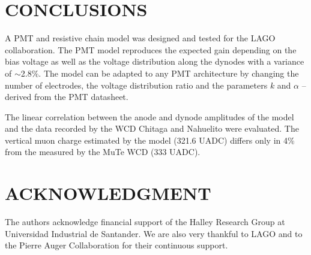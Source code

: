\documentclass[letterpaper, 10 pt, conference]{ieeeconf}  %
\begin{document}
\section{CONCLUSIONS}

A PMT and resistive chain model was designed and tested for the LAGO collaboration. The PMT model reproduces the expected gain depending on the bias voltage as well as the voltage distribution along the dynodes with a variance of $\sim$2.8$\%$. The model can be adapted to any PMT architecture by changing the number of electrodes, the voltage distribution ratio and the parameters $k$ and $\alpha$ -- derived from the PMT datasheet.

The linear correlation between the anode and dynode amplitudes of the model and the data recorded by the WCD Chitaga and Nahuelito were evaluated. The vertical muon charge estimated by the model (321.6 UADC) differs only in 4$\%$ from the measured by the MuTe WCD (333 UADC).

\addtolength{\textheight}{-12cm}   %





\section*{ACKNOWLEDGMENT}

The authors acknowledge  financial support of the Halley Research Group at Universidad Industrial de Santander. We are also very thankful to LAGO and to the Pierre Auger Collaboration for their continuous support.



\end{document}
